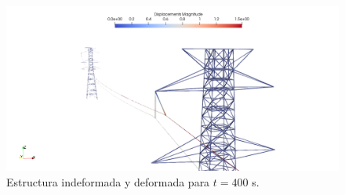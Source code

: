  
 \begin{figure}[htbp]
 	\centering
 	\includegraphics[width=120mm]{./imagenes/ResultadosNumericos/TransmissionTormenta/Deformadas.png}
 	\caption{Estructura indeformada y deformada para $t=400$ s.}
 	 \label{fig:RN:Transmission:Deformadas}
 \end{figure}